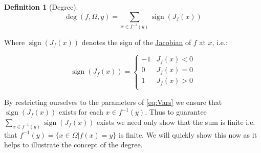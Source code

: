 \documentclass[11pt]{article}
\theoremstyle{plain}
\theoremstyle{definition}
\newtheorem{cdef}{Definition}[section]
\theoremstyle{remark}
\begin{document}
\begin{cdef}[Degree] \ \\
$$\operatorname{deg}\left(f,\Omega,y\right)=\sum\limits_{x\in f^{-1}(y)}\operatorname{sign}\left(J_f(x)\right)$$
\end{cdef}

Where $\operatorname{sign}\left(J_f(x)\right)$ denotes the sign of the \href{https://en.wikipedia.org/wiki/Jacobian_matrix_and_determinant}{Jacobian} of $f$ at $x$, i.e.:

\[\operatorname{sign}\left(J_f(x)\right)=   \left\{
\begin{array}{ll}
      -1 & J_f(x)< 0 \\
      0 & J_f(x)= 0 \\
      1 & J_f(x)> 0 \\
\end{array} 
\right. \]

By restricting ourselves to the parameters of \eqref{eq:Vars} we ensure that $\operatorname{sign}\left(J_f(x)\right)$ exists for each $x\in f^{-1}(y)$. Thus to guarantee $\sum\limits_{x\in f^{-1}(y)}\operatorname{sign}\left(J_f(x)\right)$ exists we need only show that the sum is finite i.e. that  $f^{-1}(y)=\{x\in\Omega|f(x)=y\}$ is finite. We will quickly show this now as it helps to illustrate the concept of the degree. 
\end{document}
